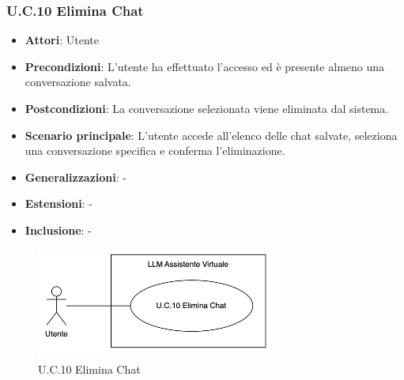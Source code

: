 \subsubsection{U.C.10 Elimina Chat}
\begin{itemize}
    \item \textbf{Attori}: Utente
    \item \textbf{Precondizioni}: L'utente ha effettuato l'accesso ed è presente almeno una conversazione salvata.
    \item \textbf{Postcondizioni}: La conversazione selezionata viene eliminata dal sistema.
    \item \textbf{Scenario principale}: L'utente accede all'elenco delle chat salvate, seleziona una conversazione specifica e conferma l'eliminazione.
    \item \textbf{Generalizzazioni}: -
    \item \textbf{Estensioni}: -
    \item \textbf{Inclusione}: -
\end{itemize}
\begin{figure}[H]
    \centering
    \includegraphics[width=0.7\textwidth]{img/UC10.png}
    \caption{U.C.10 Elimina Chat}
\end{figure}
\newpage

